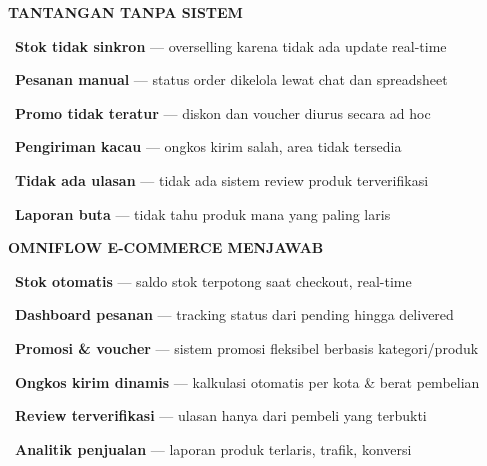 \documentclass[a4paper]{article}
\begin{document}
\noindent
\begin{minipage}[t]{0.485\textwidth}
    \colorbox{RedLight}{%
        \begin{minipage}{\dimexpr\textwidth-2\fboxsep\relax}
            {\fontsize{10}{13}\selectfont\bfseries\color{RedText} TANTANGAN TANPA SISTEM}
        \end{minipage}}\par
    \vspace{4pt}

    {\fontsize{9.5}{13}\selectfont\color{TextDark}%
    \textbullet\ \textbf{Stok tidak sinkron} --- overselling karena tidak ada update real-time\par\vspace{4pt}%
    \textbullet\ \textbf{Pesanan manual} --- status order dikelola lewat chat dan spreadsheet\par\vspace{4pt}%
    \textbullet\ \textbf{Promo tidak teratur} --- diskon dan voucher diurus secara ad hoc\par\vspace{4pt}%
    \textbullet\ \textbf{Pengiriman kacau} --- ongkos kirim salah, area tidak tersedia\par\vspace{4pt}%
    \textbullet\ \textbf{Tidak ada ulasan} --- tidak ada sistem review produk terverifikasi\par\vspace{4pt}%
    \textbullet\ \textbf{Laporan buta} --- tidak tahu produk mana yang paling laris}%
\end{minipage}%
\hfill%
\begin{minipage}[t]{0.485\textwidth}
    \colorbox{BluePrimary}{%
        \begin{minipage}{\dimexpr\textwidth-2\fboxsep\relax}
            {\fontsize{10}{13}\selectfont\bfseries\color{White} OMNIFLOW E-COMMERCE MENJAWAB}
        \end{minipage}}\par
    \vspace{4pt}

    {\fontsize{9.5}{13}\selectfont\color{TextDark}%
    \textbullet\ \textbf{Stok otomatis} --- saldo stok terpotong saat checkout, real-time\par\vspace{4pt}%
    \textbullet\ \textbf{Dashboard pesanan} --- tracking status dari pending hingga delivered\par\vspace{4pt}%
    \textbullet\ \textbf{Promosi \& voucher} --- sistem promosi fleksibel berbasis kategori/produk\par\vspace{4pt}%
    \textbullet\ \textbf{Ongkos kirim dinamis} --- kalkulasi otomatis per kota \& berat pembelian\par\vspace{4pt}%
    \textbullet\ \textbf{Review terverifikasi} --- ulasan hanya dari pembeli yang terbukti\par\vspace{4pt}%
    \textbullet\ \textbf{Analitik penjualan} --- laporan produk terlaris, trafik, konversi}%
\end{minipage}
\end{document}
